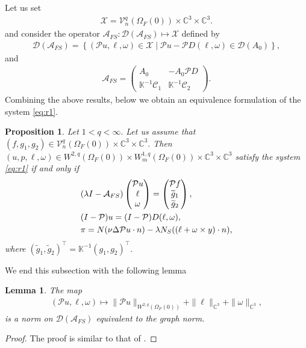 \documentclass[12pt,a4paper,reqno]{amsart}
\newtheorem{lemma}[theorem]{Lemma}
\newtheorem{proposition}[theorem]{Proposition}
\theoremstyle{definition}
\theoremstyle{remark}
\numberwithin{equation}{section}
\newcommand{\ofo}{\Omega_{F}(0)}
\newcommand{\ct}{\mathbb{C}^{3}}
\newcommand{\mx}{\mathcal{X}}
\newcommand{\md}{\mathcal{D}}
\newcommand{\mpp}{\mathcal{P}}
\begin{document}
Let us set
\begin{align} \label{eq:sp}
\mx  = \mathcal{V}^q_{n} (\ofo) \times \ct \times \ct.
\end{align}
and consider the operator $\mathcal{A}_{FS} : \mathcal{D}(\mathcal{A}_{FS}) \mapsto \mx$
defined by
\begin{align*}
\mathcal{D}(\mathcal{A}_{FS}) = \left\{ (\mpp u, \ell, \omega) \in \mx \mid \mpp u - \mpp D(\ell, \omega) \in \md(A_{0}) \right\},
\end{align*}
and
\begin{align} \label{op:afs}
\mathcal{A}_{FS} = \begin{pmatrix}
A_{0} & -A_{0}\mpp D \\  \mathbb{K}^{-1} \mathcal{C}_{1} & \mathbb{K}^{-1} \mathcal{C}_{2}
\end{pmatrix}.
\end{align}
Combining the above results, below we obtain an equivalence formulation of the system \eqref{eq:r1}.
\begin{proposition} \label{prop:ev2}
Let $1 <  q < \infty.$ Let us assume that  $(f, g_{1},g_{2}) \in \mathcal{V}^q_{n} (\ofo) \times \ct \times \ct.$ Then  $(u,p, \ell, \omega) \in W^{2,q}(\ofo) \times W^{1,q}_{m}(\ofo) \times \ct \times \ct$  satisfy the system \eqref{eq:r1} if and only if
\begin{align}
&(\lambda I - \mathcal{A}_{FS}) \begin{pmatrix}
\mpp u \\ \ell \\ \omega
\end{pmatrix} = \begin{pmatrix}
\mpp f \\ \widetilde g_{1} \\ \widetilde g_{2}
\end{pmatrix}, \\
&(I - \mpp) u = (I - \mpp) D (\ell,\omega ), \notag \\
&\pi = N (\nu \Delta \mpp u \cdot n) - \lambda N_{S} ((\ell + \omega \times y) \cdot n), \notag
\end{align}
where $(\widetilde g_{1}, \widetilde g_{2})^{\top}  = \mathbb{K}^{-1}(g_{1},g_{2})^{\top}.$
\end{proposition}

We end this subsection with the following lemma
\begin{lemma} \label{lem:eqiv-norm}
The map
\begin{align*}
(\mpp u, \ell, \omega) \mapsto \|\mpp u\|_{W^{2,q}(\ofo)} + \|\ell\|_{\ct} + \|\omega\|_{\ct},
\end{align*}
is a norm on $\mathcal{D}(\mathcal{A}_{FS})$  equivalent to the graph norm.
\end{lemma}
\begin{proof}
The proof is similar to that of \cite[Proposition 3.3]{Raymond-fsi}.
\end{proof}
\end{document}
